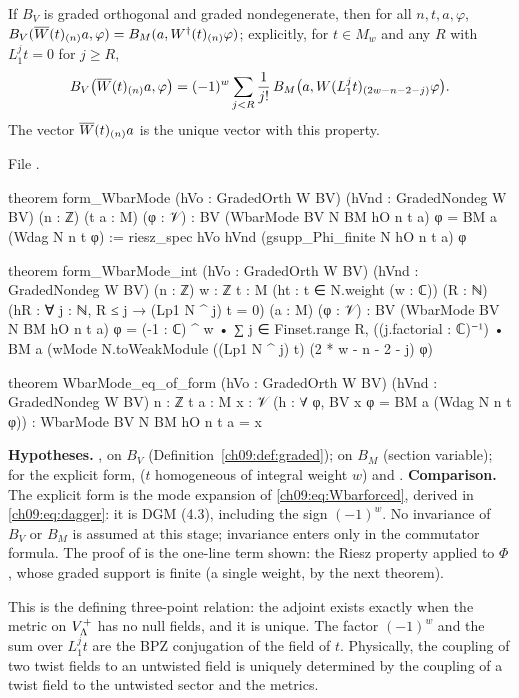 \begin{theorem}\label{ch09:thm:adj}
If $B_V$ is graded orthogonal and graded nondegenerate, then for all $n,t,a,\varphi$,
$B_V(\overline{W}(t)_{(n)}a,\varphi)=B_M(a,W^{\dagger}(t)_{(n)}\varphi)$; explicitly, for $t\in M_w$ and any
$R$ with $L_1^jt=0$ for $j\ge R$,
\begin{equation*}
B_V\big(\overline{W}(t)_{(n)}a,\varphi\big)=(-1)^w\sum_{j<R}\frac1{j!}\,B_M\big(a,W(L_1^jt)_{(2w-n-2-j)}\varphi\big).
\end{equation*}
The vector $\overline{W}(t)_{(n)}a$ is the unique vector with this property.
\end{theorem}
\noindent File .
\begin{leancode}
theorem form_WbarMode (hVo : GradedOrth W BV) (hVnd : GradedNondeg W BV) (n : ℤ) (t a : M)
    (φ : 𝒱) : BV (WbarMode BV N BM hO n t a) φ = BM a (Wdag N n t φ) :=
  riesz_spec hVo hVnd (gsupp_Phi_finite N hO n t a) φ

theorem form_WbarMode_int (hVo : GradedOrth W BV) (hVnd : GradedNondeg W BV) (n : ℤ) {w : ℤ}
    {t : M} (ht : t ∈ N.weight (w : ℂ)) (R : ℕ) (hR : ∀ j : ℕ, R ≤ j → (Lp1 N ^ j) t = 0)
    (a : M) (φ : 𝒱) :
    BV (WbarMode BV N BM hO n t a) φ = (-1 : ℂ) ^ w • ∑ j ∈ Finset.range R,
      ((j.factorial : ℂ)⁻¹) • BM a (wMode N.toWeakModule ((Lp1 N ^ j) t) (2 * w - n - 2 - j) φ)

theorem WbarMode_eq_of_form (hVo : GradedOrth W BV) (hVnd : GradedNondeg W BV) {n : ℤ} {t a : M}
    {x : 𝒱} (h : ∀ φ, BV x φ = BM a (Wdag N n t φ)) : WbarMode BV N BM hO n t a = x
\end{leancode}
\begin{dictionary}
\textbf{Hypotheses.} ,  on $B_V$ (Definition~\ref{ch09:def:graded}); 
on $B_M$ (section variable); for the explicit form,  ($t$ homogeneous of integral weight $w$)
and . \textbf{Comparison.} The explicit form is the mode expansion of
\eqref{ch09:eq:Wbarforced}, derived in \eqref{ch09:eq:dagger}: it is DGM (4.3), including the sign
$(-1)^w$. No invariance of $B_V$ or $B_M$ is assumed at this stage; invariance enters only in the
commutator formula. The proof of  is the one-line term shown: the Riesz property
applied to $\Phi$, whose graded support is finite (a single weight, by the next theorem).
\end{dictionary}

\begin{physics}
This is the defining three-point relation: the adjoint exists exactly when the metric on $V_{\Lambda}^{+}$ has no null fields, and it is unique. The factor $(-1)^w$ and the sum over $L_1^jt$ are the BPZ conjugation of the field of $t$. Physically, the coupling of two twist fields to an untwisted field is uniquely determined by the coupling of a twist field to the untwisted sector and the metrics.
\end{physics}

